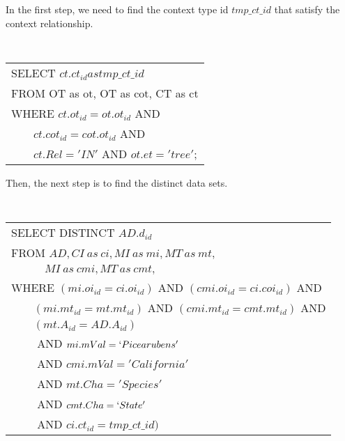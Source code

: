 
In the first step, we need to find the context type id $tmp\_ct\_id$
that satisfy the context relationship. 

{\tt 
\begin{tabular}{l}
SELECT $ct.ct_{id} as tmp\_ct\_id$\\
FROM OT as ot, OT as cot, CT as ct\\
WHERE $ct.ot_{id} = ot.ot_{id}$ AND \\
      $\qquad ct.cot_{id}= cot.ot_{id}$ AND \\
      $\qquad ct.Rel='IN'$ AND $ot.et='tree'$;
\end{tabular}
}

Then, the next step is to find the distinct data sets. 

\vspace{0.1in}
{\tt 
\begin{tabular}{l}
SELECT DISTINCT $AD.d_{id}$\\
FROM $AD, CI~as~ci, MI~as~mi, MT~as~mt,$ \\
$\quad\qquad MI~as~cmi, MT~as~cmt,$ \\
WHERE $(mi.oi_{id}=ci.oi_{id})$ AND $(cmi.oi_{id}=ci.coi_{id})$ AND\\
$\qquad (mi.mt_{id}=mt.mt_{id})$ AND $(cmi.mt_{id}=cmt.mt_{id})$ AND\\
$\qquad (mt.A_{id}=AD.A_{id})$\\
$\qquad$ AND $mi.mVal=`Picea rubens'$ \\
$\qquad$ AND $cmi.mVal='California'$\\
$\qquad$ AND $mt.Cha = 'Species'$\\
$\qquad$ AND $cmt.Cha=`State'$\\
$\qquad$ AND $ci.ct_{id} = tmp\_ct\_id)$\\
\end{tabular}
}
\vspace{0.1in}





